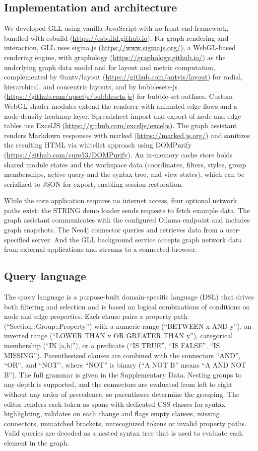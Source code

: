 \subsection{Implementation and architecture}
We developed GLL using vanilla JavaScript with no front-end framework, bundled with esbuild (\url{https://esbuild.github.io}). For graph rendering and interaction, GLL uses sigma.js (\url{https://www.sigmajs.org/}), a WebGL-based rendering engine, with graphology (\url{https://graphology.github.io/}) as the underlying graph data model and for layout and metric computation, complemented by @antv/layout (\url{https://github.com/antvis/layout}) for radial, hierarchical, and concentric layouts, and by bubblesets-js (\url{https://github.com/upsetjs/bubblesets-js}) for bubble-set outlines. Custom WebGL shader modules extend the renderer with animated edge flows and a node-density heatmap layer. Spreadsheet import and export of node and edge tables use ExcelJS (\url{https://github.com/exceljs/exceljs}). The graph assistant renders Markdown responses with marked (\url{https://marked.js.org/}) and sanitizes the resulting HTML via whitelist approach using DOMPurify (\url{https://github.com/cure53/DOMPurify}). An in-memory cache store holds shared module states and the workspace data (coordinates, filters, styles, group memberships, active query and the syntax tree, and view states), which can be serialized to JSON for export, enabling session restoration.

While the core application requires no internet access, four optional network paths exist: the STRING demo loader sends requests to fetch example data. The graph assistant communicates with the configured Ollama endpoint and includes graph snapshots. The Neo4j connector queries and retrieves data from a user-specified server. And the GLL background service accepts graph network data from external applications and streams to a connected browser.

\subsection{Query language}
The query language is a purpose-built domain-specific language (DSL) that drives both filtering and selection and is based on logical combinations of conditions on node and edge properties. Each clause pairs a property path (``Section::Group::Property'') with a numeric range (``BETWEEN x AND y''), an inverted range (``LOWER THAN x OR GREATER THAN y''), categorical membership (``IN [a,b]''), or a predicate (``IS TRUE'', ``IS FALSE'', ``IS MISSING''). Parenthesized clauses are combined with the connectors ``AND'', ``OR'', and ``NOT'', where ``NOT'' is binary (``A NOT B'' means ``A AND NOT B''). The full grammar is given in the Supplementary Data. Nesting groups to any depth is supported, and the connectors are evaluated from left to right without any order of precedence, so parentheses determine the grouping. The editor renders each token as spans with dedicated CSS classes for syntax highlighting, validates on each change and flags empty clauses, missing connectors, unmatched brackets, unrecognized tokens or invalid property paths. Valid queries are decoded as a nested syntax tree that is used to evaluate each element in the graph.

